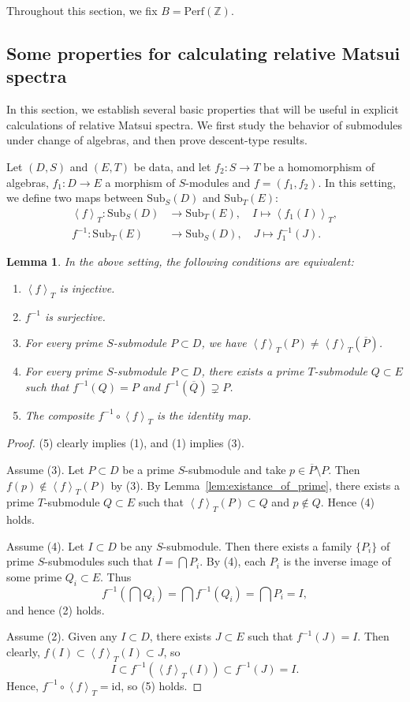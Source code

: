 \documentclass[11pt]{amsart}
\theoremstyle{definition}
\theoremstyle{plain}
\newtheorem{lem}[defn]{Lemma}
\theoremstyle{remark}
\newcommand{\perf}{\mathrm{Perf}}
\newcommand{\Sub}{\mathrm{Sub}}
\newcommand{\ol}{\overline}
\newcommand{\id}{\mathrm{id}}
\newcommand{\ang}[1]{{\left\langle{#1}\right\rangle}}
\numberwithin{equation}{section}
\begin{document}
Throughout this section, we fix \(B=\perf(\mathbb{Z})\).

\subsection{Some properties for calculating relative Matsui spectra}
In this section, we establish several basic properties that will be useful in explicit calculations of relative Matsui spectra. 
We first study the behavior of submodules under change of algebras, and then prove descent-type results.

Let \((D,S)\) and \((E,T)\) be data, and let \(f_2\colon S \to T\) be a homomorphism of algebras, \(f_1\colon D \to E\) a morphism of \(S\)-modules and \(f=(f_1,f_2)\).
In this setting, we define two maps between \(\Sub_S(D)\) and \(\Sub_T(E)\):
\begin{align*}
\ang{f}_T\colon \Sub_S(D) &\longrightarrow \Sub_T(E),\quad I \longmapsto \ang{f_1(I)}_T,\\
f^{-1} \colon \Sub_T(E) &\longrightarrow \Sub_S(D),\quad J \longmapsto f_1^{-1}(J).
\end{align*}

\begin{lem}\label{lem:change_of_algebras}
In the above setting, the following conditions are equivalent:
\begin{enumerate}
\item \(\ang{f}_T\) is injective.
\item \(f^{-1}\) is surjective.
\item For every prime \(S\)-submodule \(P \subset D\), we have \(\ang{f}_T(P) \neq \ang{f}_T(\ol{P})\).
\item For every prime \(S\)-submodule \(P \subset D\), there exists a prime \(T\)-submodule \(Q \subset E\) such that \(f^{-1}(Q) = P\) and \(f^{-1}(\ol{Q}) \supsetneq P\).
\item The composite \(f^{-1} \circ \ang{f}_T\) is the identity map.
\end{enumerate}
\end{lem}

\begin{proof}
(5) clearly implies (1), and (1) implies (3).

Assume (3).
Let \(P \subset D\) be a prime \(S\)-submodule and take \(p \in \ol{P} \setminus P\).
Then \(f(p) \notin \ang{f}_T(P)\) by (3).
By Lemma~\ref{lem:existance_of_prime}, there exists a prime \(T\)-submodule \(Q \subset E\) such that \(\ang{f}_T(P) \subset Q\) and \(p \notin Q\).
Hence (4) holds.

Assume (4).
Let \(I \subset D\) be any \(S\)-submodule.
Then there exists a family \(\{P_i\}\) of prime \(S\)-submodules such that \(I = \bigcap P_i\).
By (4), each \(P_i\) is the inverse image of some prime \(Q_i \subset E\).
Thus \[f^{-1}\!\left( \bigcap Q_i \right) = \bigcap f^{-1}(Q_i) = \bigcap P_i = I,\] and hence (2) holds.

Assume (2).
Given any \(I \subset D\), there exists \(J \subset E\) such that \(f^{-1}(J) = I\).
Then clearly, \(f(I) \subset \ang{f}_T(I) \subset J\), so \[I \subset f^{-1}(\ang{f}_T(I)) \subset f^{-1}(J) = I.\]
Hence, \(f^{-1} \circ \ang{f}_T = \id\), so (5) holds.
\end{proof}
\end{document}
